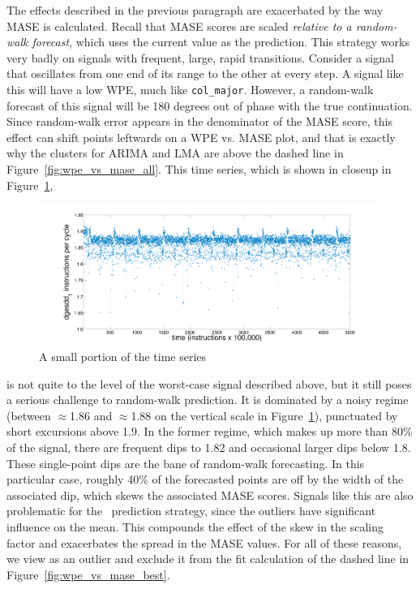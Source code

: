 The effects described in the previous paragraph are exacerbated by the
way MASE is calculated.  Recall that MASE scores are scaled
\emph{relative to a random-walk forecast}, which uses the current
value as the prediction.  This strategy works very badly on signals
with frequent, large, rapid transitions.  Consider a signal that
oscillates from one end of its range to the other at every step.  A
signal like this will have a low WPE, much like {\tt col\_major}.
However, a random-walk forecast of this signal will be 180 degrees out
of phase with the true continuation.  Since random-walk error appears
in the denominator of the MASE score, this effect can shift points
leftwards on a WPE vs. MASE plot, and that is exactly why the
\svdone clusters for ARIMA and LMA are above the dashed line in
Figure~\ref{fig:wpe_vs_mase_all}.  This time series, which is shown in
closeup in Figure~\ref{fig:svdone-ts},
\begin{figure}[htbp]
  \centering
    \includegraphics[width=\columnwidth]{figs/svdonets2}
\caption{A small portion of the \svdone time series}\label{fig:svdone-ts}
\end{figure} 
is not quite to the level of the worst-case signal described above,
but it still poses a serious challenge to random-walk prediction.  It
is dominated by a noisy regime (between $\approx$1.86 and
$\approx$1.88 on the vertical scale in Figure~\ref{fig:svdone-ts}),
punctuated by short excursions above 1.9.  In the former regime, which
makes up more than 80\% of the signal, there are frequent dips to 1.82
and occasional larger dips below 1.8.  These single-point dips are the
bane of random-walk forecasting.  In this particular case, roughly
40\% of the forecasted points are off by the width of the associated
dip, which skews the associated MASE scores.  Signals like this are
also problematic for the \naive ~prediction strategy, since the
outliers have significant influence on the mean.  This compounds the
effect of the skew in the scaling factor and exacerbates the spread in
the \svdone MASE values.  For all of these reasons, we view \svdone as
an outlier and exclude it from the fit calculation of the dashed line
in Figure~\ref{fig:wpe_vs_mase_best}.

